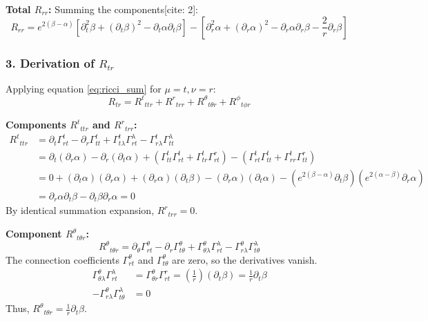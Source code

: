 \documentclass[11pt, a4paper]{report}
\begin{document}
\textbf{Total $R_{rr}$:}
Summing the components[cite: 2]:
\begin{equation}
    R_{rr} = e^{2(\beta - \alpha)} \left[ \partial_t^2 \beta + (\partial_t \beta)^2 - \partial_t \alpha \partial_t \beta \right] - \left[ \partial_r^2 \alpha + (\partial_r \alpha)^2 - \partial_r \alpha \partial_r \beta - \frac{2}{r} \partial_r \beta \right]
\end{equation}

\subsubsection*{3. Derivation of $R_{tr}$}

Applying equation \eqref{eq:ricci_sum} for $\mu=t, \nu=r$:
\begin{equation}
    R_{tr} = {R^t}_{ttr} + {R^r}_{trr} + {R^\theta}_{t\theta r} + {R^\phi}_{t\phi r}
\end{equation}

\textbf{Components ${R^t}_{ttr}$ and ${R^r}_{trr}$:}
\begin{align}
    {R^t}_{ttr} &= \partial_t \Gamma^t_{rt} - \partial_r \Gamma^t_{tt} + \Gamma^t_{t\lambda}\Gamma^\lambda_{rt} - \Gamma^t_{r\lambda}\Gamma^\lambda_{tt} \nonumber \\
    &= \partial_t (\partial_r \alpha) - \partial_r (\partial_t \alpha) + \left( \Gamma^t_{tt}\Gamma^t_{rt} + \Gamma^t_{tr}\Gamma^r_{rt} \right) - \left( \Gamma^t_{rt}\Gamma^t_{tt} + \Gamma^t_{rr}\Gamma^r_{tt} \right) \nonumber \\
    &= 0 + (\partial_t \alpha)(\partial_r \alpha) + (\partial_r \alpha)(\partial_t \beta) - (\partial_r \alpha)(\partial_t \alpha) - \left( e^{2(\beta-\alpha)}\partial_t \beta \right) \left( e^{2(\alpha-\beta)}\partial_r \alpha \right) \nonumber \\
    &= \partial_r \alpha \partial_t \beta - \partial_t \beta \partial_r \alpha = 0
\end{align}
By identical summation expansion, ${R^r}_{trr} = 0$.

\textbf{Component ${R^\theta}_{t\theta r}$:}
\begin{equation}
    {R^\theta}_{t\theta r} = \partial_\theta \Gamma^\theta_{rt} - \partial_r \Gamma^\theta_{t\theta} + \Gamma^\theta_{\theta\lambda}\Gamma^\lambda_{rt} - \Gamma^\theta_{r\lambda}\Gamma^\lambda_{t\theta}
\end{equation}
The connection coefficients $\Gamma^\theta_{rt}$ and $\Gamma^\theta_{t\theta}$ are zero, so the derivatives vanish.
\begin{align}
    \Gamma^\theta_{\theta\lambda}\Gamma^\lambda_{rt} &= \Gamma^\theta_{\theta r}\Gamma^r_{rt} = \left(\frac{1}{r}\right) (\partial_t \beta) = \frac{1}{r} \partial_t \beta \\
    -\Gamma^\theta_{r\lambda}\Gamma^\lambda_{t\theta} &= 0
\end{align}
Thus, ${R^\theta}_{t\theta r} = \frac{1}{r} \partial_t \beta$.
\end{document}
